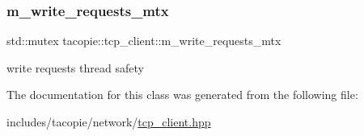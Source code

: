 \subsubsection{\texorpdfstring{m\+\_\+write\+\_\+requests\+\_\+mtx}{m\_write\_requests\_mtx}}
{\footnotesize\ttfamily std\+::mutex tacopie\+::tcp\+\_\+client\+::m\+\_\+write\+\_\+requests\+\_\+mtx\hspace{0.3cm}{\ttfamily [private]}}

write requests thread safety 

The documentation for this class was generated from the following file\+:\begin{DoxyCompactItemize}
\item 
includes/tacopie/network/\hyperlink{tcp__client_8hpp}{tcp\+\_\+client.\+hpp}\end{DoxyCompactItemize}
